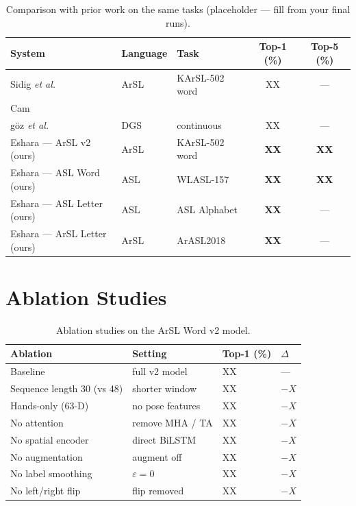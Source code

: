 \begin{table}[H]\centering
  \caption{Comparison with prior work on the same tasks (placeholder ---
           fill from your final runs).}\label{tab:cmp}
  \begin{tabularx}{\textwidth}{X l l c c}\toprule
    System & Language & Task & Top-1 (\%) & Top-5 (\%) \\\midrule
    Sidig \emph{et al.}~\cite{sidig2021karsl} & ArSL & KArSL-502 word & XX & --- \\
    Cam\\g{\"o}z \emph{et al.}~\cite{camgoz2018neural} & DGS & continuous & XX & --- \\
    Eshara --- ArSL v2 (ours)                  & ArSL & KArSL-502 word & \textbf{XX} & \textbf{XX} \\
    Eshara --- ASL Word (ours)                 & ASL  & WLASL-157      & \textbf{XX} & \textbf{XX} \\
    Eshara --- ASL Letter (ours)               & ASL  & ASL Alphabet   & \textbf{XX} & --- \\
    Eshara --- ArSL Letter (ours)              & ArSL & ArASL2018      & \textbf{XX} & --- \\\bottomrule
  \end{tabularx}
\end{table}

\section{Ablation Studies}
\label{sec:res:ablation}

\begin{table}[H]\centering
  \caption{Ablation studies on the ArSL Word v2 model.}\label{tab:ablate}
  \begin{tabularx}{\textwidth}{X l l l}\toprule
    Ablation                       & Setting              & Top-1 (\%) & $\Delta$ \\\midrule
    Baseline                       & full v2 model        & XX & --- \\
    Sequence length 30 (vs 48)     & shorter window       & XX & $-X$ \\
    Hands-only (63-D)              & no pose features     & XX & $-X$ \\
    No attention                   & remove MHA / TA      & XX & $-X$ \\
    No spatial encoder             & direct BiLSTM        & XX & $-X$ \\
    No augmentation                & augment off          & XX & $-X$ \\
    No label smoothing             & $\varepsilon = 0$    & XX & $-X$ \\
    No left/right flip             & flip removed         & XX & $-X$ \\\bottomrule
  \end{tabularx}
\end{table}

